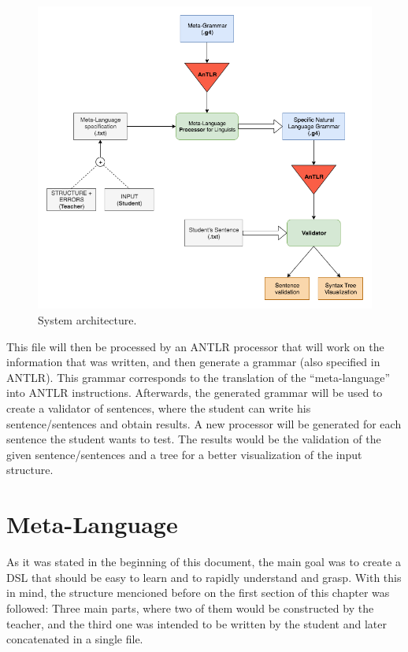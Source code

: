 \begin{figure}[h]
    \centering
    \includegraphics[width=12cm]{images/msc_system_architecture.png}
    \caption{System architecture.}
    \label{fig:system_architecture}
\end{figure}

This file will then be processed by an \textsc{ANTLR} processor that will work on the information that was written, and then generate a grammar (also specified in \textsc{ANTLR}). 
This grammar corresponds to the translation of the ``meta-language'' into \textsc{ANTLR} instructions. 
Afterwards, the generated grammar will be used to create a validator of sentences, where the student can write his sentence/sentences and obtain results.
A new processor will be generated for each sentence the student wants to test.
The results would be the validation of the given sentence/sentences and a tree for a better visualization of the input structure.


\section{Meta-Language}
As it was stated in the beginning of this document, the main goal was to create a \textsc{DSL} that should be easy to learn and to rapidly understand and grasp. With this in mind, the structure mencioned before on the first section
of this chapter was followed: Three main parts, where two of them would be constructed by the teacher, and the third one was intended to be written by the student and later concatenated in a single file.

